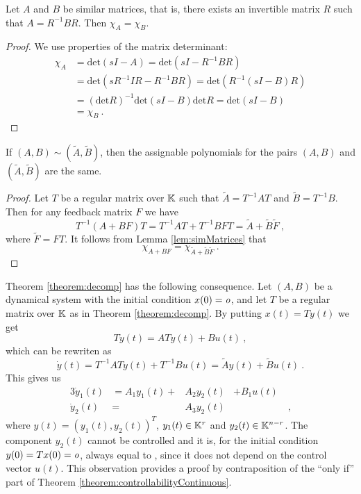 \begin{lemma}
	\label{lem:simMatrices}
	Let $A$ and $B$ be similar matrices, that is, there exists an invertible matrix $R$ such that $A=R^{-1}BR$. Then $\chi_A=\chi_B$.
\end{lemma}

\begin{proof}
	We use properties of the matrix determinant:
	\begin{align*}
		\chi_A&=\text{det}(sI-A)=\text{det}(sI-R^{-1}BR) \\
		&=\text{det}(sR^{-1}IR-R^{-1}BR)=\text{det}(R^{-1}(sI-B)R) \\
		&=(\text{det}R)^{-1}\text{det}(sI-B)\text{det}R=\text{det}(sI-B) \\
		&=\chi_B\ .
	\end{align*}
\end{proof}

\begin{lemma}
	\label{lem:simPairsAssignablePolynomial}
	If $(A,B)\sim(\widetilde{A},\widetilde{B})$, then the assignable polynomials for the pairs $(A,B)$ and $(\widetilde{A},\widetilde{B})$ are the same.
\end{lemma}

\begin{proof}
	Let $T$ be a regular matrix over $\mathbb{K}$ such that $\widetilde{A}=T^{-1}AT$ and $\widetilde{B}=T^{-1}B$. Then for any feedback matrix $F$ we have 
	$$T^{-1}(A+BF)T=T^{-1}AT+T^{-1}BFT=\widetilde{A}+\widetilde{B}\widetilde{F}\ ,$$
	where $\widetilde{F}=FT$. It follows from Lemma \ref{lem:simMatrices} that $$\chi_{A+BF}=\chi_{\widetilde{A}+\widetilde{B}\widetilde{F}}\ .$$
\end{proof}

Theorem \ref{theorem:decomp} has the following consequence. Let $(A,B)$ be a dynamical system with the initial condition $x(0)=\textit{o}$, and let $T$ be a regular matrix over $\mathbb{K}$ as in Theorem \ref{theorem:decomp}. By putting $x(t)=Ty(t)$ we get 
$$T\dot{y}(t)=ATy(t)+Bu(t)\ ,$$ 
which can be rewriten as 
$$\dot{y}(t)=T^{-1}ATy(t)+T^{-1}Bu(t)=\widetilde{A}y(t)+\widetilde{B}u(t)\ .$$ 
This gives us 
\begin{alignat*}{3}
	\dot{y}_1(t)&=A_1y_1(t)+&A_2y_2(t)&+B_1u(t)& \\
	\dot{y}_2(t)&=&A_3y_2(t)&&\ ,
\end{alignat*}
where $y(t)=(y_1(t),y_2(t))^T$, $y_1(t)\in\mathbb{K}^r$ and $y_2(t)\in\mathbb{K}^{n-r}$. The component $y_2(t)$ cannot be controlled and it is, for the initial condition $y(0)=Tx(0)=\textit{o}$, always equal to \nullvector, since it does not depend on the control vector $u(t)$. This observation provides a proof by contraposition of the ``only if'' part of Theorem \ref{theorem:controllabilityContinuous}.

